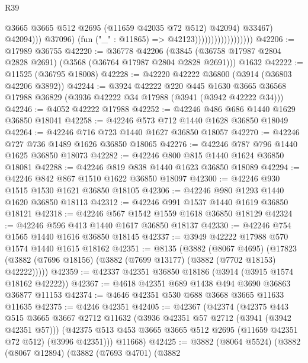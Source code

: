 \begin{lexlean}{R39}
\begin{coremodule}
                                                  @3665
                                                  @3665
                                                  @512
                                                  @2695
                                                  (@11659 @42035 @72 @512)
                                                  @42094)
                                                @33467)
                                              @42094)))
                                        @37096)
                                      (fun ("_" : @11865) => @42123))))))))))))))))))
@42206 := @17989 @36755
@42220 := @36778
    @42206
    (@3845 (@36758 @17987 @2804 @2828 @2691) (@3568 (@36764 @17987 @2804 @2828 @2691)))
    @1632
@42222 := @11525 (@36795 @18008)
@42228 := @42220 @42222 @36800 (@3914 (@36803 @42206 @3892))
@42244 := @3924
    @42222
    @220
    @445
    @1630
    @3665
    @36568
    @17988
    @36829
    (@3936 @42222 @34 @17988 (@3941 (@3942 @42222 @34)))
@42246 := @4052 @42222 @17988
@42252 := @42246 @486 @686 @1440 @1629 @36850 @18041
@42258 := @42246 @573 @712 @1440 @1628 @36850 @18049
@42264 := @42246 @716 @723 @1440 @1627 @36850 @18057
@42270 := @42246 @727 @736 @1489 @1626 @36850 @18065
@42276 := @42246 @787 @796 @1440 @1625 @36850 @18073
@42282 := @42246 @800 @815 @1440 @1624 @36850 @18081
@42288 := @42246 @819 @838 @1440 @1623 @36850 @18089
@42294 := @42246 @842 @867 @1510 @1622 @36850 @18097
@42300 := @42246 @930 @1515 @1530 @1621 @36850 @18105
@42306 := @42246 @980 @1293 @1440 @1620 @36850 @18113
@42312 := @42246 @991 @1537 @1440 @1619 @36850 @18121
@42318 := @42246 @567 @1542 @1559 @1618 @36850 @18129
@42324 := @42246 @596 @413 @1440 @1617 @36850 @18137
@42330 := @42246 @754 @1565 @1440 @1616 @36850 @18145
@42337 := @3949 @42222 @17988 @570 @1574 @1440 @1615 @18162
@42351 := @8135
    (@3882
      (@8067 @4695)
      (@17823 (@3882 (@7696 @18156) (@3882 (@7699 @13177) (@3882 (@7702 @18153) @42222)))))
@42359 := @42337 @42351 @36850 @18186 (@3914 (@3915 @1574 @18162 @42222))
@42367 := @4618 @42351 @689 @1438 @494 @3690 @36863 @36877 @11153
@42374 := @4646 @42351 @530 @688 @3668 @3665 @11633 @11635
@42375 := @4246 @42351
@42405 := @42367
    (@42374
      (@42375
        @443
        @515
        @3665
        @3667
        @2712
        @11632
        (@3936 @42351 @57 @2712 (@3941 (@3942 @42351 @57)))
        (@42375 @513 @453 @3665 @3665 @512 @2695 (@11659 @42351 @72 @512) (@3996 @42351)))
      @11668)
@42425 := @3882
    (@8064 @5524)
    (@3882
      (@8067 @12894)
      (@3882
        (@7693 @4701)
        (@3882

\end{coremodule}
\end{lexlean}
